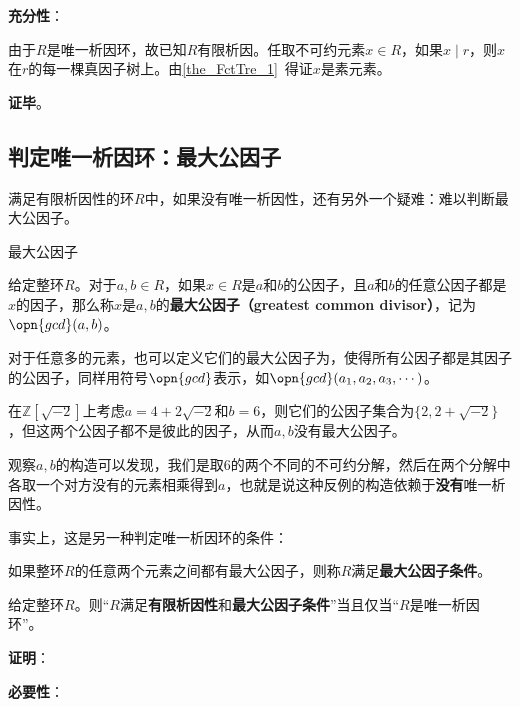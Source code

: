 \textbf{充分性}：

由于$R$是唯一析因环，故已知$R$有限析因。任取不可约元素$x\in R$，如果$x\mid r$，则$x$在$r$的每一棵真因子树上。由\autoref{the_FctTre_1}~得证$x$是素元素。

\textbf{证毕}。







\subsection{判定唯一析因环：最大公因子}



满足有限析因性的环$R$中，如果没有唯一析因性，还有另外一个疑难：难以判断最大公因子。


\begin{definition}{最大公因子}

给定整环$R$。对于$a, b\in R$，如果$x\in R$是$a$和$b$的公因子，且$a$和$b$的任意公因子都是$x$的因子，那么称$x$是$a, b$的\textbf{最大公因子（greatest common divisor）}，记为$\opn{gcd}(a, b)$。

对于任意多的元素，也可以定义它们的最大公因子为，使得所有公因子都是其因子的公因子，同样用符号$\opn{gcd}$表示，如$\opn{gcd}(a_1, a_2, a_3, \cdots)$。

\end{definition}


在$\mathbb{Z}[\sqrt{-2}]$上考虑$a=4+2\sqrt{-2}$和$b=6$，则它们的公因子集合为$\{2, 2+\sqrt{-2}\}$，但这两个公因子都不是彼此的因子，从而$a, b$没有最大公因子。

观察$a, b$的构造可以发现，我们是取$6$的两个不同的不可约分解，然后在两个分解中各取一个对方没有的元素相乘得到$a$，也就是说这种反例的构造依赖于\textbf{没有}唯一析因性。

事实上，这是另一种判定唯一析因环的条件：



\begin{definition}{}
如果整环$R$的任意两个元素之间都有最大公因子，则称$R$满足\textbf{最大公因子条件}。
\end{definition}


\begin{theorem}{}
给定整环$R$。则“$R$满足\textbf{有限析因性}和\textbf{最大公因子条件}”当且仅当“$R$是唯一析因环”。
\end{theorem}


\textbf{证明}：

\textbf{必要性}：

